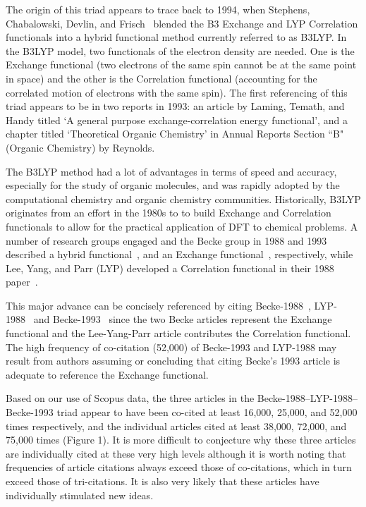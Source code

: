 \documentclass[11pt, oneside]{article}   	%
\begin{document}
The origin of this triad appears to trace back to 1994, when Stephens, Chabalowski, Devlin, and Frisch~\citep{stephens1994ab} blended the B3 Exchange and LYP Correlation functionals into a hybrid functional method currently  referred to as B3LYP.  In the B3LYP model, two functionals of the electron density are needed. One is the Exchange functional (two electrons of the same spin cannot be at the same point in space) and the other is the Correlation functional (accounting for the correlated motion of electrons with the same spin). The first referencing of this triad appears to be in two reports in 1993: an article by Laming, Temath, and Handy\citep{laming1993} titled `A general purpose exchange‐correlation energy functional', and a chapter titled `Theoretical Organic Chemistry' in Annual Reports Section ``B" (Organic Chemistry) by Reynolds\citep{reynolds1993theoretical}.

The B3LYP method had a lot of advantages in terms of speed and accuracy, especially for the study of organic molecules, and was rapidly adopted by the computational chemistry and organic chemistry communities. Historically, B3LYP originates from an effort in the 1980s to to build Exchange and Correlation functionals to allow for the practical application of DFT to chemical problems. A number of research groups engaged and the Becke group in 1988 and 1993 described a hybrid functional~\citep{becke1988density}, and an Exchange functional~\citep{becke1993dft}, respectively, while Lee, Yang, and Parr (LYP) developed a Correlation functional in their 1988 paper~\citep{lyp1988}.  

This major advance can be concisely referenced by citing Becke-1988~\citep{becke1988density}, LYP-1988~\citep{lyp1988} and Becke-1993~\citep{becke1993dft} since the two Becke articles represent the Exchange functional and the Lee-Yang-Parr article contributes the Correlation functional. The high frequency of co-citation (52,000) of Becke-1993 and LYP-1988 may result from authors assuming or concluding that citing Becke's 1993 article is adequate to reference the Exchange functional. 

Based on our use of Scopus data, the three articles in the Becke-1988--LYP-1988--Becke-1993 triad appear to have been co-cited at least 16,000, 25,000, and 52,000 times respectively, and the individual articles cited at least 38,000, 72,000, and 75,000 times (Figure 1). It is more difficult to conjecture why these three articles are individually cited at these very high levels although it is worth noting that  frequencies of article citations always exceed those of co-citations, which in turn exceed those of tri-citations. It is also very likely that these articles have individually stimulated new ideas.
\end{document}
